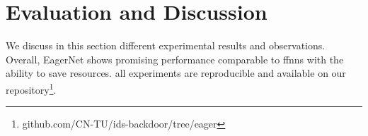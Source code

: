 \documentclass[conference]{IEEEtran}
\begin{document}
%



\section{Evaluation and Discussion}
\label{evaluation_and_discussion}
We discuss in this section different experimental results and observations. Overall, EagerNet shows promising performance comparable to \glspl{ffnn} with the ability to save resources. all experiments are reproducible and available on our repository\footnote{github.com/CN-TU/ids-backdoor/tree/eager}.
\end{document}
